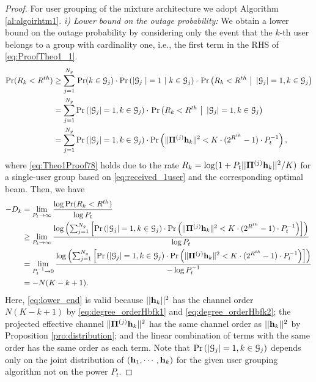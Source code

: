 \documentclass[11pt, draft, onecolumn ]{IEEEtran}
\begin{document}
\begin{proof} {}{For user grouping of the mixture architecture we adopt Algorithm \ref{al:algoirhtm1}.}
{\em i) Lower bound on the outage probability:}  We obtain a lower bound on the outage probability by considering only the event that the $k$-th user belongs to a group with cardinality one, i.e., the first term in the RHS of \eqref{eq:ProofTheo1_1}.
\begin{align}
            \mathrm{Pr}(R_k < R^{th}) &\geq \sum_{j=1}^{N_g} \left. \mathrm{Pr}( k \in {\cal G}_j )  \cdot    \mathrm{Pr}\left(|{\cal G}_j \right.|  = 1 ~|~k \in {\cal G}_j\right) \cdot   \left.\mathrm{Pr}\left(R_k < R^{th} ~ \right| ~ |{\cal G}_j|=1, k \in {\cal G}_j \right)   \nonumber \\
                              &= \sum_{j=1}^{N_g} \mathrm{Pr}\left( | {\cal G}_j | = 1 , k \in {\cal G}_j\right) \cdot   \left.\mathrm{Pr}\left(R_k < R^{th} ~ \right| ~ |{\cal G}_j|=1, k \in {\cal G}_j \right)   \nonumber  \\
                              &=  \sum_{j=1}^{N_g}  \mathrm{Pr}\left( | {\cal G}_j | = 1 , k \in {\cal G}_j\right) \cdot \mathrm{Pr}\left(\|{\bf \Pi}^{(j)} {\bf h}_k\|^2 < K \cdot (2^{R^{th}} -1) \cdot P_t^{-1} \right), \label{eq:Theo1Proof78}
\end{align}
where  \eqref{eq:Theo1Proof78} holds due to  the rate $R_k = \log( 1 + P_t ||{\bf \Pi}^{(j)} {\bf h}_k||^2/K)$ for a single-user group based on \eqref{eq:received_1user}  and the corresponding optimal beam. %
Then, we have
\begin{align}
         -D_k  &=\lim_{P_t \rightarrow \infty} \frac{ \log \mathrm{Pr}(R_k < R^{th})}{\log P_t} \label{eq:lower_start} \\
           &  \geq
           \lim_{P_t \rightarrow \infty} \frac{\log \left(\sum_{j=1}^{N_g} \left[ \mathrm{Pr}\left( | {\cal G}_j | = 1 , k \in {\cal G}_j\right) \cdot \mathrm{Pr}\left(\|{\bf \Pi}^{(j)} {\bf h}_k\|^2 < K \cdot (2^{R^{th}} -1) \cdot P_t^{-1} \right) \right]\right) }{ \log P_t} \\
             &  =
           \lim_{P_t^{-1} \rightarrow 0} \frac{\log \left(\sum_{j=1}^{N_g} \left[ \mathrm{Pr}\left( | {\cal G}_j | = 1 , k \in {\cal G}_j\right) \cdot \mathrm{Pr}\left(\|{\bf \Pi}^{(j)} {\bf h}_k\|^2 < K \cdot (2^{R^{th}} -1) \cdot P_t^{-1} \right) \right]\right) }{ -\log P_t^{-1}} \\
           &  = - N (K -k + 1). \label{eq:lower_end}
\end{align}
Here, \eqref{eq:lower_end} is valid because $||{\bf h}_k||^2$ has the channel order $N(K-k+1)$ by \eqref{eq:degree_orderHbfk1}
and \eqref{eq:degree_orderHbfk2};  the projected effective channel $\|{\bf \Pi}^{(j)} {\bf h}_k\|^2$ has the same channel order as $||{\bf h}_k||^2$ by Proposition \ref{pro:distribution}; and the linear combination of terms with the same order has the same order as each term. Note that $\mathrm{Pr}\left( | {\cal G}_j | = 1 , k \in {\cal G}_j\right)$ depends only on the joint distribution of $({\bf h}_1,\cdots,{\bf h}_k)$ for the given user grouping algorithm not on the power $P_t$.






\end{proof}
\end{document}
